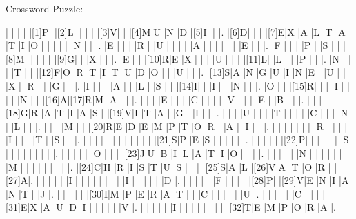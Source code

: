\documentclass[12pt]{article}
\begin{document}
\libertine
\renewcommand\PuzzleClueFont{\rm\normalsize}

\begin{center}
  \huge{Crossword Puzzle:}
\end{center}
\vspace{1.5cm}
\begin{Puzzle}{22}{25}
  |{}  |{}  |{}  |{}  |[1]P|{}  |[2]L|{}  |{}  |{}  |{}  |[3]V|{}  |{}  |[4]M|U   |N   |D   |[5]I|{}  |{}  |.
  |[6]D|{}  |{}  |{}  |[7]E|X   |A   |L   |T   |A   |T   |I   |O   |{}  |{}  |{}  |{}  |{}  |N   |{}  |{}  |.
  |E   |{}  |{}  |{}  |R   |{}  |U   |{}  |{}  |{}  |{}  |A   |{}  |{}  |{}  |{}  |{}  |{}  |E   |{}  |{}  |.
  |F   |{}  |{}  |{}  |P   |{}  |S   |{}  |{}  |[8]M|{}  |{}  |{}  |{}  |{}  |[9]G|{}  |{}  |X   |{}  |{}  |.
  |E   |{}  |{}  |[10]R|E   |X   |{}  |{}  |{}  |U   |{}  |{}  |{}  |[11]L|{}  |L   |{}  |{}  |P   |{}  |{}  |.
  |N   |{}  |{}  |{}  |T   |{}  |{}  |[12]F|O   |R   |T   |I   |T   |U   |D   |O   |{}  |{}  |U   |{}  |{}  |.
  |[13]S|A   |N   |G   |U   |I   |N   |E   |{}  |U   |{}  |{}  |{}  |X   |{}  |R   |{}  |{}  |G   |{}  |{}  |.
  |I   |{}  |{}  |{}  |A   |{}  |{}  |L   |{}  |S   |{}  |{}  |[14]I|{}  |{}  |I   |{}  |{}  |N   |{}  |{}  |.
  |O   |{}  |{}  |[15]R|{}  |{}  |{}  |I   |{}  |{}  |{}  |{}  |N   |{}  |{}  |[16]A|[17]R|M   |A   |{}  |{}  |.
  |{}  |{}  |{}  |E   |{}  |{}  |{}  |C   |{}  |{}  |{}  |{}  |V   |{}  |{}  |{}  |E   |{}  |B   |{}  |{}  |.
  |{}  |{}  |{}  |[18]G|R   |A   |T   |I   |A   |S   |{}  |[19]V|I   |T   |A   |{}  |G   |{}  |I   |{}  |{}  |.
  |{}  |{}  |{}  |U   |{}  |{}  |{}  |T   |{}  |{}  |{}  |{}  |C   |{}  |{}  |{}  |N   |{}  |L   |{}  |{}  |.
  |{}  |{}  |{}  |M   |{}  |{}  |[20]R|E   |D   |E   |M   |P   |T   |O   |R   |{}  |A   |{}  |I   |{}  |{}  |.
  |{}  |{}  |{}  |{}  |{}  |{}  |{}  |R   |{}  |{}  |{}  |{}  |I   |{}  |{}  |{}  |T   |{}  |S   |{}  |{}  |.
  |{}  |{}  |{}  |{}  |{}  |{}  |{}  |{}  |{}  |{}  |{}  |{}  |[21]S|P   |E   |S   |{}  |{}  |{}  |{}  |{}  |.
  |{}  |{}  |{}  |{}  |{}  |[22]P|{}  |{}  |{}  |{}  |{}  |{}  |S   |{}  |{}  |{}  |{}  |{}  |{}  |{}  |{}  |.
  |{}  |{}  |{}  |{}  |{}  |O   |{}  |{}  |{}  |[23]J|U   |B   |I   |L   |A   |T   |I   |O   |{}  |{}  |{}  |.
  |{}  |{}  |{}  |{}  |{}  |N   |{}  |{}  |{}  |{}  |{}  |{}  |M   |{}  |{}  |{}  |{}  |{}  |{}  |{}  |{}  |.
  |[24]C|H   |R   |I   |S   |T   |U   |S   |{}  |{}  |{}  |[25]S|A   |L   |[26]V|A   |T   |O   |R   |{}  |[27]A|.
  |{}  |{}  |{}  |{}  |{}  |I   |{}  |{}  |{}  |{}  |{}  |{}  |{}  |{}  |I   |{}  |{}  |{}  |{}  |{}  |D   |.
  |{}  |{}  |{}  |{}  |{}  |F   |{}  |{}  |{}  |{}  |[28]P|{}  |[29]V|E   |N   |I   |A   |N   |T   |{}  |J   |.
  |{}  |{}  |{}  |{}  |{}  |[30]I|M   |P   |E   |R   |A   |T   |{}  |{}  |C   |{}  |{}  |{}  |{}  |{}  |U   |.
  |{}  |{}  |{}  |{}  |{}  |C   |{}  |{}  |{}  |[31]E|X   |A   |U   |D   |I   |{}  |{}  |{}  |{}  |{}  |V   |.
  |{}  |{}  |{}  |{}  |{}  |I   |{}  |{}  |{}  |{}  |{}  |{}  |{}  |{}  |[32]T|E   |M   |P   |O   |R   |A   |.
\end{Puzzle}
\end{document}
